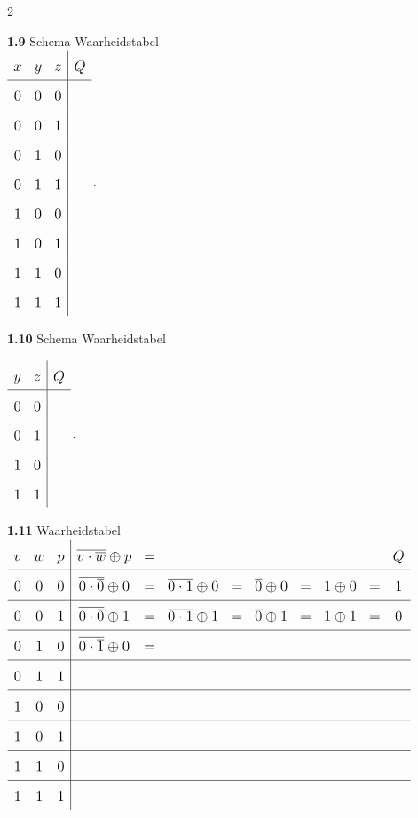 \documentclass[a4paper,12pt]{paper}
\begin{document}
\begin{multicols}{2}
\begin{tcolorbox}
\textbf{1.9}
Schema \hspace{18em}  Waarheidstabel\\
\raggedleft
\hspace{10em}\(
\large
\begin{array}{ccc|c}
x & y & z & Q\\
\hline
0 & 0 & 0 &   \\
0 & 0 & 1 &   \\
0 & 1 & 0 &   \\
0 & 1 & 1 &   \\
1 & 0 & 0 &   \\
1 & 0 & 1 &   \\
1 & 1 & 0 &   \\
1 & 1 & 1 &   \\
\end{array}
\)\hspace{0.2cm}.

\vspace{0.2cm}
\end{tcolorbox}

\begin{tcolorbox}
\textbf{1.10}
Schema \hspace{7.5cm} Waarheidstabel

\raggedleft
\(
\large
\begin{array}{cc|c}
y & z & Q \\
\hline
0 & 0 &   \\
0 & 1 &   \\
1 & 0 &   \\
1 & 1 &  
\end{array}
\)\hspace{0.2cm}.

\vspace{3.2cm}
\end{tcolorbox}



\columnbreak

\begin{tcolorbox}
\textbf{1.11} Waarheidstabel\\[0.7em]
\(
{\renewcommand{\arraystretch}{1.7}
\large
\begin{array}{ccc|ccccccccccc}
v & w & p &  \overline{v\cdot\overline{w}}\oplus p &=&&&&&&&Q\\\hline
0 & 0 & 0 & \overline{0\cdot\overline{0}}\oplus 0 & = & \overline{0\cdot1}\oplus 0 & = &  \overline{0}\oplus 0 & = & 1\oplus 0 & = & 1\\\hline
0 & 0 & 1 & \overline{0\cdot\overline{0}}\oplus 1 & = & \overline{0\cdot1}\oplus 1 & = &  \overline{0}\oplus 1 & = & 1\oplus 1 & = & 0\\\hline
0 & 1 & 0 & \overline{0\cdot\overline{1}}\oplus 0 & = \\\hline
0 & 1 & 1 & \\\hline
1 & 0 & 0 &   \\\hline
1 & 0 & 1 &   \\\hline
1 & 1 & 0 &   \\\hline
1 & 1 & 1 &   
\end{array}}
\)\\[0.7em]


\end{tcolorbox}
\end{multicols}
\end{document}
